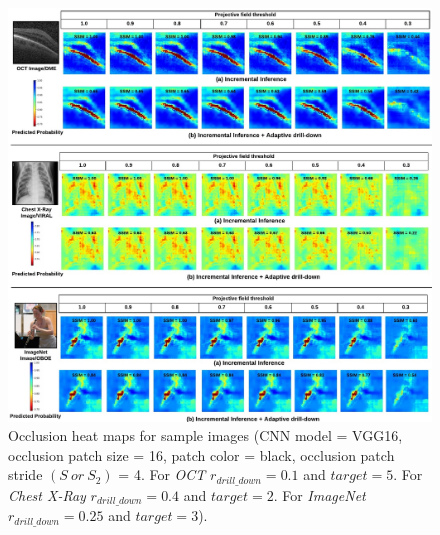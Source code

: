 \begin{figure}[t]
\includegraphics[width=\textwidth]{images/visual_examples}
\caption{Occlusion heat maps for sample images (CNN model = VGG16, occlusion patch size = 16, patch color = black, occlusion patch stride $(S~or~S_2)$ = 4. For \textit{OCT} $r_{drill\_down}=0.1$ and $\mathit{target}=5$. For \textit{Chest X-Ray} $r_{drill\_down}=0.4$ and $\mathit{target}=2$. For \textit{ImageNet} $r_{drill\_down}=0.25$ and $\mathit{target}=3$).}
\label{fig:visual_examples}
\end{figure}